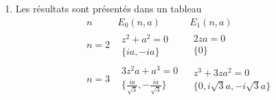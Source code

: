 \begin{enumerate}
 \item Les résultats sont présentés dans un tableau
\begin{displaymath}
\renewcommand{\arraystretch}{2}
\begin{array}{c|c|c}
n &  E_0(n,a) & E_1(n,a) \\ 
\hline n=2 & 
\begin{array}{c}
 z^2 + a^2=0 \\
 \{ia,-ia\}
\end{array}

&
\begin{array}{c}
 2za=0  \\ \{ 0 \}
\end{array}\\
\hline n=3 & 
\begin{array}{c}
3z^2a+a^3=0 \\ \{ \frac{ia}{\sqrt{3}}, -\frac{ia}{\sqrt{3}}\}
\end{array}

&
\begin{array}{c}
 z^3+3za^2=0 \\ \{0, i\sqrt{3}a, - i\sqrt{3}a\}
\end{array}



\end{array}
\end{displaymath}
\end{enumerate}
